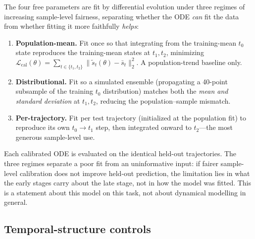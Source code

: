 \documentclass[10pt,letterpaper]{article}
\begin{document}
The four free parameters are fit by differential evolution under three regimes of increasing sample-level fairness, separating whether the ODE \emph{can} fit the data from whether fitting it more faithfully \emph{helps}:
\begin{enumerate}
    \item \textbf{Population-mean.} Fit once so that integrating from the training-mean $t_0$ state reproduces the training-mean states at $t_1,t_2$, minimizing $\mathcal{L}_{\mathrm{cal}}(\theta)=\sum_{t\in\{t_1,t_2\}}\lVert\tilde{s}_t(\theta)-\bar{s}_t\rVert_2^2$. A population-trend baseline only.
    \item \textbf{Distributional.} Fit so a simulated ensemble (propagating a 40-point subsample of the training $t_0$ distribution) matches both the \emph{mean and standard deviation} at $t_1,t_2$, reducing the population--sample mismatch.
    \item \textbf{Per-trajectory.} Fit per test trajectory (initialized at the population fit) to reproduce its own $t_0\!\rightarrow\!t_1$ step, then integrated onward to $t_2$---the most generous sample-level use.
\end{enumerate}
Each calibrated ODE is evaluated on the identical held-out trajectories. The three regimes separate a poor fit from an uninformative input: if fairer sample-level calibration does not improve held-out prediction, the limitation lies in what the early stages carry about the late stage, not in how the model was fitted. This is a statement about this model on this task, not about dynamical modelling in general.

\subsection*{Temporal-structure controls}
\label{subsec:controls}
\end{document}

